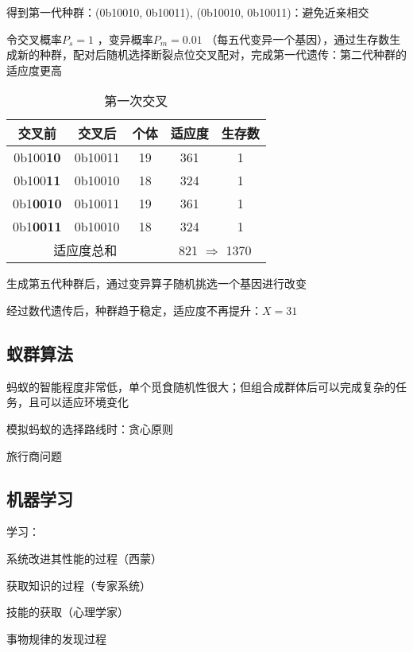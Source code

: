 \begin{eg}
    得到第一代种群：(0b10010, 0b10011), (0b10010, 0b10011)：避免近亲相交

    令交叉概率$P_s=1$ ，变异概率$P_m=0.01$ （每五代变异一个基因），通过生存数生成新的种群，配对后随机选择断裂点位交叉配对，完成第一代遗传：第二代种群的适应度更高
    \begin{table}[htpb]
        \centering
        \caption{第一次交叉}
        \label{tab:第一次交叉}
        \begin{tabular}{|c|c|c|c|c|}
        \hline
        交叉前 & 交叉后 & 个体 & 适应度 & 生存数 \\
        \hline
        0b100\textbf{10} & 0b10011 & 19 & 361 & 1 \\
        0b100\textbf{11} & 0b10010 & 18 & 324 & 1 \\
        \hline
        0b1\textbf{0010} & 0b10011 & 19 & 361 & 1 \\
        0b1\textbf{0011} & 0b10010 & 18 & 324 & 1 \\
        \hline
        \multicolumn{3}{|c|}{适应度总和} & \multicolumn{2}{|c|}{821 $\Rightarrow $ 1370}\\
        \hline
        \end{tabular}
    \end{table}

    生成第五代种群后，通过变异算子随机挑选一个基因进行改变

    经过数代遗传后，种群趋于稳定，适应度不再提升：$X=31$
\end{eg}
\subsection{蚁群算法}%
\label{sub:蚁群算法}
\begin{notation}
    蚂蚁的智能程度非常低，单个觅食随机性很大；但组合成群体后可以完成复杂的任务，且可以适应环境变化
\end{notation}
模拟蚂蚁的选择路线时：贪心原则
\begin{eg}
    旅行商问题
\end{eg}
\subsection{机器学习}%
\label{sub:机器学习}
\begin{defi}
    学习：

    系统改进其性能的过程（西蒙）

    获取知识的过程（专家系统）

    技能的获取（心理学家）

    事物规律的发现过程
\end{defi}



